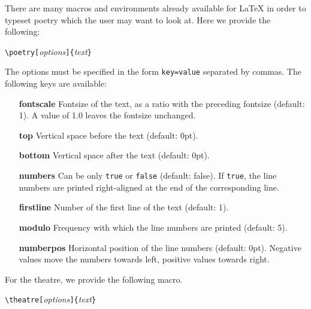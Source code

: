\documentclass[11pt,a4paper]{article}
\begin{document}
	There are many macros and environments already available for {\LaTeX} in order to typeset poetry which the user may want to look at. Here we provide the following:
	
	\medskip
	
	\verb|\poetry[|\emph{options}\verb|]{|\emph{text}\verb|}| 	
	
	\medskip
	
	The options must be specified in the form \verb|key=value| separated by commas. The following keys are available:
	\begin{itemize}
		\item[\textbf{fontscale}] Fontsize of the text, as a ratio with the preceding fontsize (default: 1). A value of 1.0 leaves the fontsize  unchanged.
		\item[\textbf{top}] Vertical space before the text (default: 0pt).
		\item[\textbf{bottom}] Vertical space after the text (default: 0pt).
		\item[\textbf{numbers}] Can be only \verb|true| or \verb|false| (default: false). If \verb|true|, the line numbers are printed right-aligned at the end of the corresponding line.
		\item[\textbf{firstline}] Number of the first line of the text (default: 1).
		\item[\textbf{modulo}] Frequency with which the line numbers are printed (default: 5).
		\item[\textbf{numberpos}] Horizontal position of the line numbers (default: 0pt). Negative values move the numbers towards left, positive values towards right.
	\end{itemize}
	
	For the theatre, we provide the following macro.
	
	\medskip
	
	\verb|\theatre[|\emph{options}\verb|]{|\emph{text}\verb|}| 	
	
	\medskip
	
\end{document}
